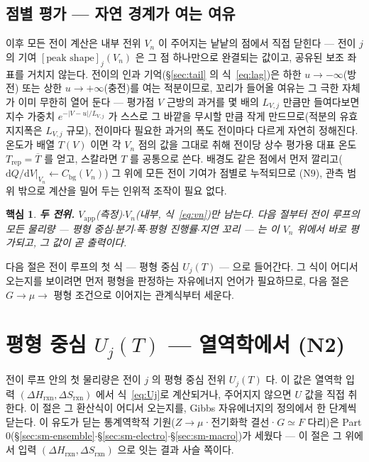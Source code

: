 \documentclass[11pt,a4paper]{article}
\newtheorem*{keybox}{핵심}
\newcommand{\dd}{\mathrm{d}}
\newcommand{\app}{\mathrm{app}}
\newcommand{\bg}{\mathrm{bg}}
\newcommand{\rxn}{\mathrm{rxn}}
\newcommand{\rep}{\mathrm{rep}}
\begin{document}
\subsection{점별 평가 --- 자연 경계가 여는 여유}
이후 모든 전이 계산은 내부 전위 $V_n$ 이 주어지는 낱낱의 점에서 직접 닫힌다 --- 전이 $j$ 의 기여
$[\text{peak shape}]_j(V_n)$ 은 그 점 하나만으로 완결되는 값이고, 공유된 보조 좌표를 거치지 않는다.
전이의 인과 기억(\S\ref{sec:tail} 의 식~\eqref{eq:lag})은 하한 $u\to-\infty$(방전) 또는 상한
$u\to+\infty$(충전)를 여는 적분이므로, 꼬리가 들어올 여유는 그 극한 자체가 이미 무한히 열어 둔다 ---
평가점 $V$ 근방의 과거를 몇 배의 $L_{V,j}$ 만큼만 들여다보면 지수 가중치 $e^{-|V-u|/L_{V,j}}$ 가 스스로
그 바깥을 무시할 만큼 작게 만드므로(적분의 유효 지지폭은 $L_{V,j}$ 규모), 전이마다 필요한 과거의 폭도
전이마다 다르게 자연히 정해진다. 온도가 배열 $T(V)$ 이면 각 $V_n$ 점의 값을 그대로 취해 전이당 상수
평가용 대표 온도 $T_\rep=\overline{T}$ 를 얻고, 스칼라면 $T$ 를 공통으로 쓴다. 배경도 같은 점에서
먼저 깔리고($\dd Q/\dd V|_{V_n}\leftarrow C_\bg(V_n)$) 그 위에 모든 전이 기여가 점별로 누적되므로
($\mathrm N9$), 관측 범위 밖으로 계산을 밀어 두는 인위적 조작이 필요 없다.

\begin{keybox}
\textbf{두 전위.} $V_\app$(측정)$\cdot$$V_n$(내부, 식~\eqref{eq:vn})만 남는다. 다음 절부터 전이 루프의 모든
물리량 --- 평형 중심$\cdot$분기$\cdot$폭$\cdot$평형 진행률$\cdot$지연 꼬리 --- 는 이 $V_n$ 위에서 바로
평가되고, 그 값이 곧 출력이다.
\end{keybox}

다음 절은 전이 루프의 첫 식 — 평형 중심 $U_j(T)$ — 으로 들어간다. 그 식이 어디서 오는지를 보이려면 먼저 평형을
판정하는 자유에너지 언어가 필요하므로, 다음 절은 $G\to\mu\to$ 평형 조건으로 이어지는 관계식부터 세운다.

\section{평형 중심 $U_j(T)$ — 열역학에서 (N2)}\label{sec:center}
전이 루프 안의 첫 물리량은 전이 $j$ 의 평형 중심 전위 $U_j(T)$ 다. 이 값은 열역학 입력 $(\Delta H_\rxn,\Delta S_\rxn)$
에서 식~\eqref{eq:Uj}로 계산되거나, 주어지지 않으면 $U$ 값을 직접 취한다. 이 절은 그 환산식이 어디서 오는지를, Gibbs
자유에너지의 정의에서 한 단계씩 닫는다. 이 유도가 딛는 통계역학적 기원($Z\to\mu$·전기화학 결선·$G\simeq F$ 다리)은
Part 0(\S\ref{sec:sm-ensemble}$\cdot$\S\ref{sec:sm-electro}$\cdot$\S\ref{sec:sm-macro})가 세웠다 — 이 절은 그 위에서 입력
$(\Delta H_\rxn,\Delta S_\rxn)$ 으로 잇는 결과 사슬 쪽이다.
\end{document}
